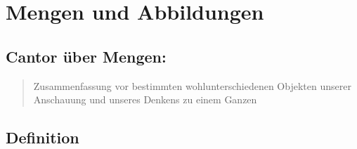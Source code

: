 
\newcommand{\fach}{Analysis \RM{1}.}
\newcommand{\semester}{WiSe 2012}
\newcommand{\homepage}{http://wwwmath.uni-muenster.de/u/wilhelm.winter/wwinter/analysis_I.html}
\newcommand{\prof}{Prof.\,Dr.\,Wilhelm Winter}




\maketitle
\begin{abstract}

\section*{Hinweis}
Verglichen mit den neueren Mitschriften ist dieses Skript in einem deutlich schlechteren Zustand, hauptsächlich in technischer Hinsicht, aber auch die inhaltliche 
Fehlersuche war bei weitem nicht so intensiv \ldots damals hatte ich gerade erst angefangen  mich mit \LaTeX{} zu beschäftigen.

Ich plane nicht, daran in näherer Zukunft etwas zu verändern, da dies ziemlich viel Zeit in Anspruch nehmen würde, die 
anderweitig besser investiert ist. Sollte jemand Lust dazu haben, wäre die wichtigste Baustelle das Inhaltsverzeichnis, in dem kurze Beschreibungen der Sätze, Lemmata, etc.
fehlen. Außerdem müssen die Labels eindeutig werden. Wie man dies handhaben kann, sieht man gut in den Dateien der späteren Semester.
\end{abstract}

\setcounter{page}{1}
\tableofcontents
\cleardoubleoddemptypage
{}
\setcounter{page}{1}


\setcounter{section}{-1}
\section{Mengen und Abbildungen}

\subsection{Cantor über Mengen:}
\begin{quote} 
\glqq Zusammenfassung vor bestimmten wohlunterschiedenen Objekten unserer Anschauung und unseres Denkens zu einem Ganzen\grqq
\end{quote}

\subsection{Definition}
\renewcommand{\labelenumi}{(\roman{enumi})}


